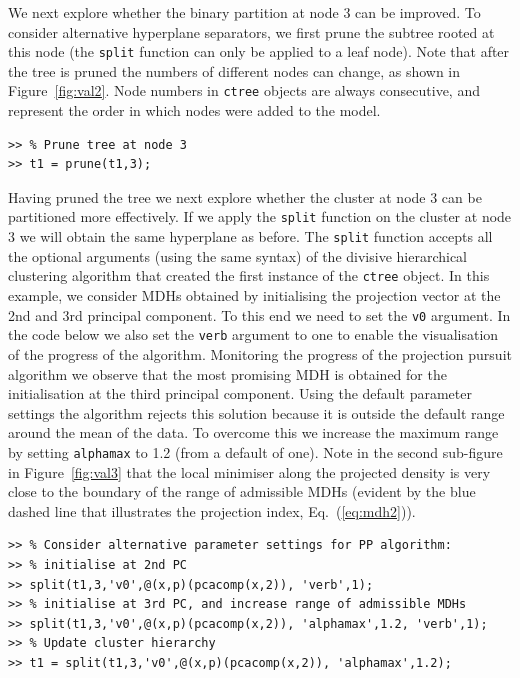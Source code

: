 \documentclass{book}
\begin{document}
\noindent
%
We next explore whether the binary partition at node 3 can be improved.
%
To consider alternative hyperplane separators, we first
prune the subtree rooted at this node (the {\tt split} function can
only be applied to a leaf node). Note that after the tree is pruned
the numbers of different nodes can change,
as shown in Figure~\ref{fig:val2}. Node numbers in {\tt ctree} objects
are always consecutive, and represent the order in which nodes were added to the model.

\begin{verbatim}
>> % Prune tree at node 3
>> t1 = prune(t1,3);
\end{verbatim}

Having pruned the tree we next explore whether the cluster at node 3 can be
partitioned more effectively. If we apply the {\tt split} function on the
cluster at node 3 we will obtain the same hyperplane as before. 
%
%
The {\tt split} function accepts all the optional arguments (using
the same syntax) of the divisive hierarchical clustering algorithm
that created the first instance of the {\tt ctree} object.
%
In this example,
we consider MDHs obtained by initialising the projection vector
at the 2nd and 3rd principal
component. To this end we need to set the {\tt v0} argument.
%
In the code below we also set the {\tt verb} argument to one to enable
the visualisation of the progress of the algorithm.
%
Monitoring the progress of the projection pursuit algorithm we observe that the
most promising MDH is obtained for the initialisation at the third principal
component. Using the default parameter settings the algorithm rejects this solution
because it is outside the default range around the mean of the data.
%
To overcome this we increase the maximum range by setting
{\tt alphamax} to 1.2 (from a default of one). Note in the second sub-figure in Figure~\ref{fig:val3}
that the local minimiser along the projected density is very close
to the boundary of the range of admissible MDHs (evident by
the blue dashed line that illustrates the projection index, Eq.~(\ref{eq:mdh2})).

\begin{verbatim}
>> % Consider alternative parameter settings for PP algorithm:
>> % initialise at 2nd PC
>> split(t1,3,'v0',@(x,p)(pcacomp(x,2)), 'verb',1);
>> % initialise at 3rd PC, and increase range of admissible MDHs
>> split(t1,3,'v0',@(x,p)(pcacomp(x,2)), 'alphamax',1.2, 'verb',1);
>> % Update cluster hierarchy
>> t1 = split(t1,3,'v0',@(x,p)(pcacomp(x,2)), 'alphamax',1.2);
\end{verbatim}
\end{document}
